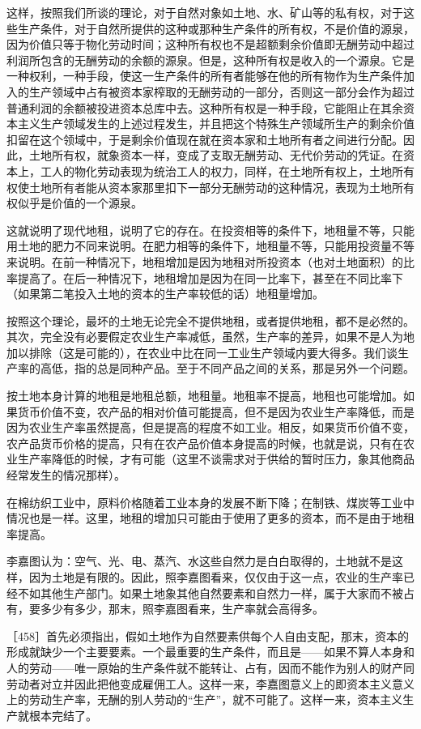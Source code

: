 这样，按照我们所谈的理论，对于自然对象如土地、水、矿山等的私有权，对于这些生产条件，对于自然所提供的这种或那种生产条件的所有权，不是价值的源泉，因为价值只等于物化劳动时间；这种所有权也不是超额剩余价值即无酬劳动中超过利润所包含的无酬劳动的余额的源泉。但是，这种所有权是收入的一个源泉。它是一种权利，一种手段，使这一生产条件的所有者能够在他的所有物作为生产条件加入的生产领域中占有被资本家榨取的无酬劳动的一部分，否则这一部分会作为超过普通利润的余额被投进资本总库中去。这种所有权是一种手段，它能阻止在其余资本主义生产领域发生的上述过程发生，并且把这个特殊生产领域所生产的剩余价值扣留在这个领域中，于是剩余价值现在就在资本家和土地所有者之间进行分配。因此，土地所有权，就象资本一样，变成了支取无酬劳动、无代价劳动的凭证。在资本上，工人的物化劳动表现为统治工人的权力，同样，在土地所有权上，土地所有权使土地所有者能从资本家那里扣下一部分无酬劳动的这种情况，表现为土地所有权似乎是价值的一个源泉。

这就说明了现代地租，说明了它的存在。在投资相等的条件下，地租量不等，只能用土地的肥力不同来说明。在肥力相等的条件下，地租量不等，只能用投资量不等来说明。在前一种情况下，地租增加是因为地租对所投资本（也对土地面积）的比率提高了。在后一种情况下，地租增加是因为在同一比率下，甚至在不同比率下（如果第二笔投入土地的资本的生产率较低的话）地租量增加。

按照这个理论，最坏的土地无论完全不提供地租，或者提供地租，都不是必然的。其次，完全没有必要假定农业生产率减低，虽然，生产率的差异，如果不是人为地加以排除（这是可能的），在农业中比在同一工业生产领域内要大得多。我们谈生产率的高低，指的总是同种产品。至于不同产品之间的关系，那是另外一个问题。

按土地本身计算的地租是地租总额，地租量。地租率不提高，地租也可能增加。如果货币价值不变，农产品的相对价值可能提高，但不是因为农业生产率降低，而是因为农业生产率虽然提高，但是提高的程度不如工业。相反，如果货币价值不变，农产品货币价格的提高，只有在农产品价值本身提高的时候，也就是说，只有在农业生产率降低的时候，才有可能（这里不谈需求对于供给的暂时压力，象其他商品经常发生的情况那样）。

在棉纺织工业中，原料价格随着工业本身的发展不断下降；在制铁、煤炭等工业中情况也是一样。这里，地租的增加只可能由于使用了更多的资本，而不是由于地租率提高。

李嘉图认为：空气、光、电、蒸汽、水这些自然力是白白取得的，土地就不是这样，因为土地是有限的。因此，照李嘉图看来，仅仅由于这一点，农业的生产率已经不如其他生产部门。如果土地象其他自然要素和自然力一样，属于大家而不被占有，要多少有多少，那末，照李嘉图看来，生产率就会高得多。

［458］首先必须指出，假如土地作为自然要素供每个人自由支配，那末，资本的形成就缺少一个主要要素。一个最重要的生产条件，而且是——如果不算人本身和人的劳动——唯一原始的生产条件就不能转让、占有，因而不能作为别人的财产同劳动者对立并因此把他变成雇佣工人。这样一来，李嘉图意义上的即资本主义意义上的劳动生产率，无酬的别人劳动的“生产”，就不可能了。这样一来，资本主义生产就根本完结了。

